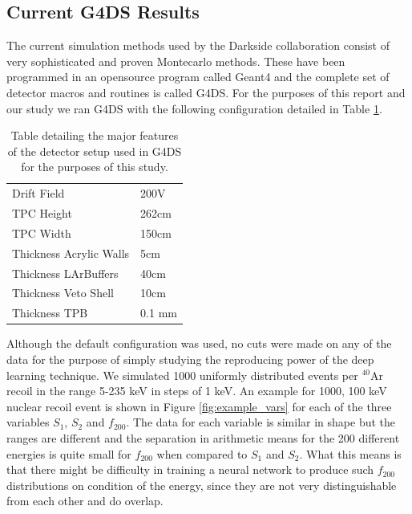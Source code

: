 \documentclass[11pt]{article} %
\begin{document}
\subsection{Current G4DS Results}
The current simulation methods used by the Darkside collaboration consist of very sophisticated and proven Montecarlo methods.
These have been programmed in an opensource program called Geant4 and the complete set of detector macros and routines is called G4DS.
For the purposes of this report and our study we ran G4DS with the following configuration detailed in Table \ref{table:g4ds_config}.
\begin{table}[!h]
\centering
\begin{tabular}{l|l}
\hline
Drift Field & 200V \\
TPC Height & 262cm \\
TPC Width & 150cm \\
Thickness Acrylic Walls & 5cm \\
Thickness LArBuffers & 40cm \\
Thickness Veto Shell & 10cm \\
Thickness TPB & 0.1 mm \\
\hline
\end{tabular}
\caption{Table detailing the major features of the detector setup used in G4DS for the purposes of this study.}
\label{table:g4ds_config}
\end{table}
Although the default configuration was used, no cuts were made on any of the data for the purpose of simply studying the reproducing power of the deep learning technique.
We simulated 1000 uniformly distributed events per $^{40}\mathrm{\text{Ar}}$ recoil in the range 5-235 keV in steps of 1 keV.
An example for 1000, 100 keV nuclear recoil event is shown in Figure \ref{fig:example_vars} for each of the three variables $S_1$, $S_2$ and $f_{200}$.
The data for each variable is similar in shape but the ranges are different and the separation in arithmetic means for the 200 different energies is quite small for $f_{200}$
when compared to $S_1$ and $S_2$.
What this means is that there might be difficulty in training a neural network to produce such $f_{200}$ distributions on condition of the energy, since they are not very distinguishable from each other and do overlap.
\end{document}
